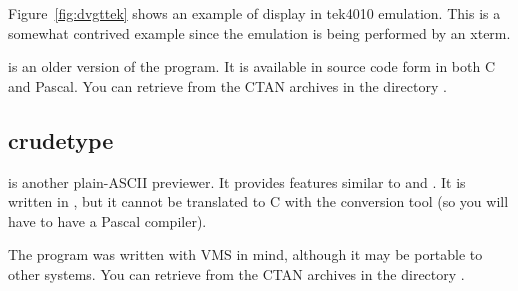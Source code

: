 Figure~\ref{fig:dvgttek}
shows an example of  display in
tek4010 emulation.  This is a somewhat contrived example since the
emulation is being performed by an xterm.


 is an older version of the program.  It is available in
source code form in both C and Pascal.  
You can retrieve 
from the CTAN archives in the directory .

\subsection{crudetype}

is
another plain-ASCII previewer.  It provides features
similar to  and .  It is written in \Web,
but it cannot be translated to C with the  conversion tool
(so you will have to have a Pascal compiler).

The  program was written with VMS in mind, although it
may be portable to other systems.
You can retrieve 
from the CTAN archives in the directory .

\egroup %

